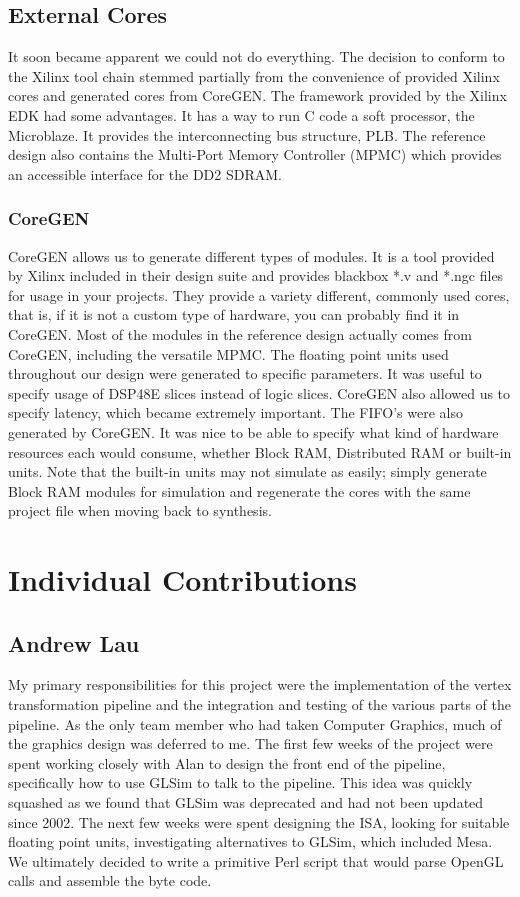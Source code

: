 \documentclass[letterpaper,10pt]{article}
\begin{document}
\subsection{External Cores}
It soon became apparent we could not do everything. The decision to conform to the Xilinx tool chain stemmed partially from the convenience of provided Xilinx cores and generated cores from CoreGEN.  The framework provided by the Xilinx EDK had some advantages.  It has a way to run C code a soft processor, the Microblaze.  It provides the interconnecting bus structure, PLB.  The reference design also contains the Multi-Port Memory Controller (MPMC) which provides an accessible interface for the DD2 SDRAM.  

\subsubsection{CoreGEN}
CoreGEN allows us to generate different types of modules.  It is a tool provided by Xilinx included in their design suite and provides blackbox *.v and *.ngc files for usage in your projects.  They provide a variety different, commonly used cores, that is, if it is not a custom type of hardware, you can probably find it in CoreGEN.  Most of the modules in the reference design actually comes from CoreGEN, including the versatile MPMC.  The floating point units used throughout our design were generated to specific parameters.  It was useful to specify usage of DSP48E slices instead of logic slices.  CoreGEN also allowed us to specify latency, which became extremely important.  The FIFO's were also generated by CoreGEN.  It was nice to be able to specify what kind of hardware resources each would consume, whether Block RAM, Distributed RAM or built-in units.  Note that the built-in units may not simulate as easily; simply generate Block RAM modules for simulation and regenerate the cores with the same project file when moving back to synthesis.


\section{Individual Contributions}
\subsection{Andrew Lau}
My primary responsibilities for this project were the implementation of the vertex transformation pipeline and the integration and testing of the various parts of the pipeline. As the only team member who had taken Computer Graphics, much of the graphics design was deferred to me. The first few weeks of the project were spent working closely with Alan to design the front end of the pipeline, specifically how to use GLSim to talk to the pipeline. This idea was quickly squashed as we found that GLSim was deprecated and had not been updated since 2002. The next few weeks were spent designing the ISA, looking for suitable floating point units, investigating alternatives to GLSim, which included Mesa. We ultimately decided to write a primitive Perl script that would parse OpenGL calls and assemble the byte code.
\end{document}
